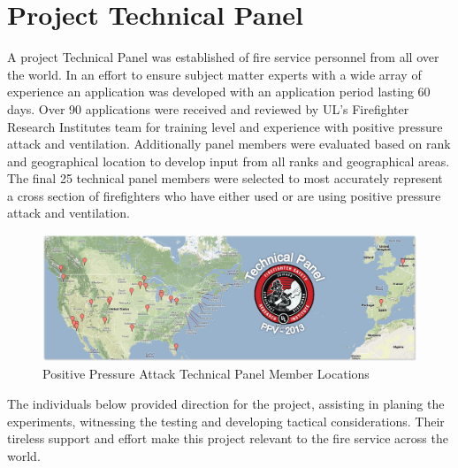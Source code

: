 \documentclass{article}
\begin{document}
\section{Project Technical Panel}

A project Technical Panel was established of fire service personnel from all over the world. In an effort to ensure subject matter experts with a wide array of experience an application was developed with an application period lasting 60 days. Over 90 applications were received and reviewed by UL's Firefighter Research Institutes team for training level and experience with positive pressure attack and ventilation. Additionally panel members were evaluated based on rank and geographical location to develop input from all ranks and geographical areas. The final 25 technical panel members were selected to most accurately represent a cross section of firefighters who have either used or are using positive pressure attack and ventilation. 

\begin{figure}[H]
	\centering
	\includegraphics[width = 5in]{0_Images/Technical_Panel/TechnicalPanelLocations.png} 
	\caption{Positive Pressure Attack Technical Panel Member Locations}
	\label{fig:PanelLocatoins}
\end{figure} 

The individuals below provided direction for the project, assisting in planing the experiments, witnessing the testing and developing tactical considerations. Their tireless support and effort make this project relevant to the fire service across the world. 

\renewcommand{\arraystretch}{1.5}
\end{document}
